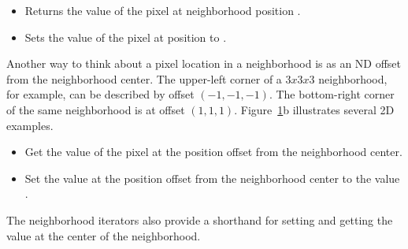 {\begin{itemize}

\item \textbf{} Returns the value
of the pixel at neighborhood position .

\item \textbf{} Sets
the value of the pixel at position  to .

\end{itemize}

\begin{figure}
\centering
\protect\label{fig:NeighborhoodArray}
\end{figure}

Another way to think about a pixel location in a neighborhood is as an ND
offset from the neighborhood center.  The upper-left corner of a $3x3x3$
neighborhood, for example, can be described by offset $(-1, -1, -1)$. The
bottom-right corner of the same neighborhood is at offset $(1, 1, 1)$.  
Figure~\ref{fig:NeighborhoodArray}b illustrates several 2D examples.

\begin{itemize}

\item \textbf{} Get the value of
the pixel at the position offset  from the neighborhood center.

\item \textbf{} Set
the value at the position offset  from the neighborhood center to
the value .

\end{itemize}

The neighborhood iterators also provide a shorthand for setting and getting the
value at the center of the neighborhood.

\begin{itemize}


\end{itemize}}
